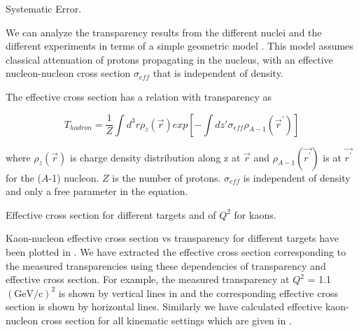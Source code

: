 \begin{table}
  \caption[Systematic Error.]{\label{tab:err_1}Systematic Error.}

\end{table}

%
%
%
We can analyze the transparency results from the different nuclei and the different experiments in
terms of a simple geometric model \cite{ON95, jain}. This model assumes classical attenuation of protons propagating in the nucleus, with an effective nucleon-nucleon cross section $\sigma_{eff}$ that is independent of density.

The effective cross section has a relation with transparency as

\begin{equation} \label{equ:eff1}
T_{hadron} = {\frac{1}{Z}}\int d^{3}r \rho_{z}(\vec{r})exp\left[-\int dz'\sigma_{eff} \rho_{A-1}(\vec{r}^\prime)\right]
\end{equation}

\noindent
where $\rho_z(\vec{r})$ is charge density distribution along z at $\vec{r}$ and  $\rho_{A-1}(\vec{r^\prime})$ is at $\vec{r^\prime}$ for the ($A$-1) nucleon. $Z$ is the number of protons. $\sigma_{eff}$ is independent of density and only a free parameter in the equation.

\begin{table}
  \caption[Effective cross section for different targets and of $Q^2$ for kaons.]{\label{tab:eff_cr1}Effective cross section for different targets and of $Q^2$ for kaons.}

\end{table}

%
\label{Effective cross-section of kaons($K^+$)}
Kaon-nucleon effective cross section vs transparency for different targets have been plotted in . We have extracted the effective cross section corresponding to the measured transparencies using these dependencies of transparency and effective cross section. For example, the measured transparency at $Q^2$ = 1.1 $(\mathrm{GeV/c})^2$ is shown by vertical lines in  and the corresponding effective cross section is shown by horizontal lines. Similarly we have calculated effective kaon-nucleon cross section for all kinematic settings which are given in .

